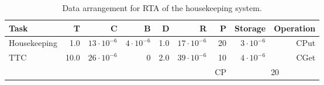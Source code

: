 \begin{table}[htb]
\begin{center}
\begin{tabular}{|l|r|r|r|r|r|r|r|r|} \hline
Task & T & C & B & D & R & P & Storage & Operation\\ \hline
Housekeeping & 1.0 & $13\cdot10^{-6}$ & $4\cdot10^{-6}$ & 1.0 & $17\cdot10^{-6}$& 20 & $3\cdot10^{-6}$ & CPut \\
TTC & 10.0 & $26\cdot10^{-6}$ & 0 & 2.0 & $39\cdot10^{-6}$ & 10 & $4\cdot10^{-6}$ & CGet \\ \hline
& & & & & & CP & \multicolumn{2}{|c|}{20} \\ \hline
\end{tabular}
\caption{Data arrangement for RTA of the housekeeping system.}
\label{tb:wcet}
\end{center}
\end{table}
